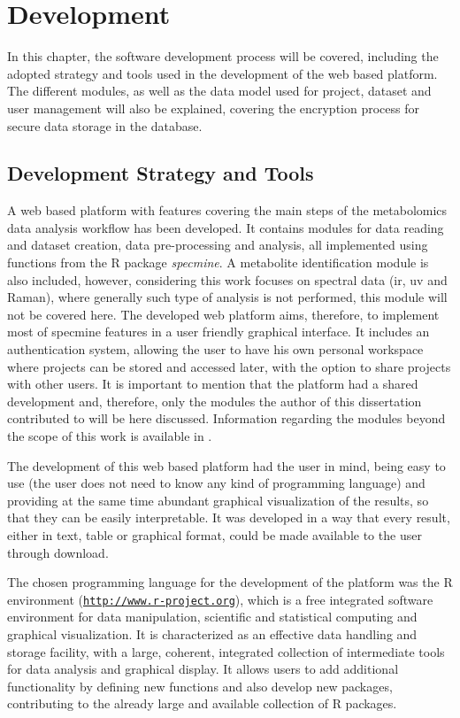 
\chapter{Development} \label{development}

In this chapter, the software development process will be covered, including the adopted strategy and tools used in the development of the web based platform. The different modules, as well as the data model used for project, dataset and user management will also be explained, covering the encryption process for secure data storage in the database.


\section{Development Strategy and Tools}

A web based platform with features covering the main steps of the metabolomics data analysis workflow has been developed. It contains modules for data reading and dataset creation, data pre-processing and analysis, all implemented using functions from the R package \textit{specmine}. A metabolite identification module is also included, however, considering this work focuses on spectral data (\gls{ir}, \gls{uv} and Raman), where generally such type of analysis is not performed, this module will not be covered here. The developed web platform aims, therefore, to implement most of specmine features in a user friendly graphical interface. It includes an authentication system, allowing the user to have his own personal workspace where projects can be stored and accessed later, with the option to share projects with other users. It is important to mention that the platform had a shared development and, therefore, only the modules the author of this dissertation contributed to will be here discussed. Information regarding the modules beyond the scope of this work is available in \cite{sara}.

The development of this web based platform had the user in mind, being easy to use (the user does not need to know any kind of programming language) and providing at the same time abundant graphical visualization of the results, so that they can be easily interpretable. It was developed in a way that every result, either in text, table or graphical format, could be made available to the user through download. 

The chosen programming language for the development of the platform was the R environment (\href{http://www.r-project.org}{\nolinkurl{http://www.r-project.org}}), which is a free integrated software environment for data manipulation, scientific and statistical computing and graphical visualization. It is characterized as an effective data handling and storage facility, with a large, coherent, integrated collection of intermediate tools for data analysis and graphical display. It allows users to add additional functionality by defining new functions and also develop new packages, contributing to the already large and available collection of R packages. 

